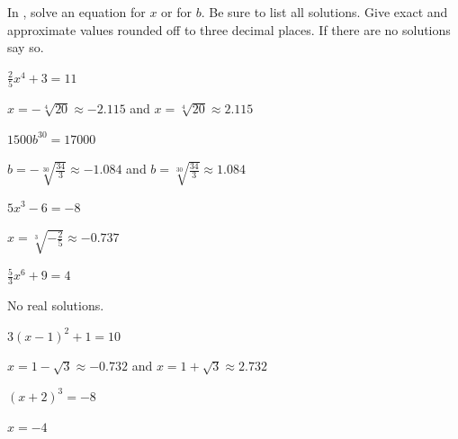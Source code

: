 
In , solve an equation for $x$ or for $b$. Be sure to list all solutions. Give exact and approximate values rounded off to three decimal places. If there are no solutions say so.

\begin{exercise}\label{exercise-4.2.1}
$\displaystyle \frac{2}{5}x^4+3=11$
\end{exercise}

\begin{solution}
$x=-\sqrt[4]{20}\approx-2.115$ and $x=\sqrt[4]{20}\approx2.115$
\end{solution}

\begin{exercise}
$\displaystyle 1500b^{30}=17000$
\end{exercise}

\begin{solution}
$b=-\sqrt[30]{\frac{34}{3}} \approx -1.084$ and $b=\sqrt[30]{\frac{34}{3}} \approx 1.084$
\end{solution}

\begin{exercise}
$\displaystyle 5x^3-6=-8$
\end{exercise}

\begin{solution}
$x=\sqrt[3]{-\frac{2}{5}}\approx-0.737$
\end{solution}

\begin{exercise}
$\displaystyle \frac{5}{3}x^6+9=4$
\end{exercise}

\begin{solution}
No real solutions.
\end{solution}

\begin{exercise}
$\displaystyle 3(x-1)^2+1=10$
\end{exercise}

\begin{solution}
$x=1-\sqrt{3}\approx-0.732$ and $x=1+\sqrt{3}\approx2.732$
\end{solution}

\begin{exercise}\label{exercise-4.2.6}
$\displaystyle (x+2)^3=-8$
\end{exercise}

\begin{solution}
$x=-4$
\end{solution}







